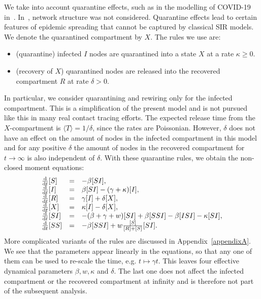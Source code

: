 \documentclass[12pt]{article}
\def\txtd{{\textnormal{d}}}
\begin{document}
We take into account quarantine effects, such as in the modelling of COVID-19 in~\cite{MaierBrockmann}. In~\cite{MaierBrockmann}, network structure was not considered. Quarantine effects lead to certain features of epidemic spreading that cannot be captured by classical SIR models. We denote the quarantined compartment by $X$. The rules we use are:

\begin{itemize}
 \item (quarantine) infected $I$ nodes are quarantined into a state $X$ at a rate $\kappa\geq 0$.
 \item (recovery of $X$) quarantined nodes are released into the recovered compartment $R$ at rate $\delta>0$.
\end{itemize}

In particular, we consider quarantining and rewiring only for the infected compartment. This is a simplification of the present model and is not pursued like this in many real contact tracing efforts. The expected release time from the $X$-compartment is $\langle T\rangle = 1/\delta$, since the rates are Poissonian. However, $\delta$ does not have an effect on the amount of nodes in the infected compartment in this model and for any positive $\delta$ the amount of nodes in the recovered compartment for $t\to\infty$ is also independent of $\delta$. With these quarantine rules, we obtain the non-closed moment equations:
\begin{equation}
\label{eq:adaptiveSIRX}
\begin{array}{lcl}
 \frac{\txtd }{\txtd t} [S]
 &=&
 -\beta [SI], 
 \\
 \frac{\txtd }{\txtd t} [I]
 &=&
 \beta [SI] - (\gamma + \kappa)[I], 
 \\
 \frac{\txtd }{\txtd t} [R]
 &=&
\gamma [I] +\delta[X],
 \\
 \frac{\txtd }{\txtd t} [X]
 &=&
\kappa[I] - \delta[X],
 \\
 \frac{\txtd }{\txtd t} [SI]
 &=&
 -(\beta+\gamma+w)[SI] + \beta[SSI] -\beta[ISI] - \kappa [SI],
 \\
 \frac{\txtd }{\txtd t} [SS]
 &=&
- \beta [SSI] + w\frac{[S]}{[R]+[S]} [SI].
\end{array}
 \end{equation}
 More complicated variants of the rules are discussed in Appendix~\ref{appendixA}. 
 We see that the parameters appear linearly in the equations, so that any one of them can be used to re-scale the time, e.g. $t\mapsto \gamma t$. This leaves four effective dynamical parameters $\beta, w, \kappa$ and $\delta$. The last one does not affect the infected compartment or the recovered compartment at infinity and is therefore not part of the subsequent analysis.
 
\end{document}
